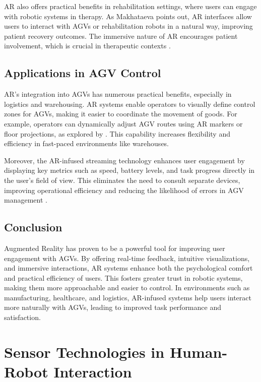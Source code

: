 AR also offers practical benefits in rehabilitation settings, where users can engage with robotic systems in therapy. As Makhataeva \cite{Makhataeva2020} points out, AR interfaces allow users to interact with AGVs or rehabilitation robots in a natural way, improving patient recovery outcomes. The immersive nature of AR encourages patient involvement, which is crucial in therapeutic contexts \cite{Makhataeva2020}.

\subsection{Applications in AGV Control}

AR’s integration into AGVs has numerous practical benefits, especially in logistics and warehousing. AR systems enable operators to visually define control zones for AGVs, making it easier to coordinate the movement of goods. For example, operators can dynamically adjust AGV routes using AR markers or floor projections, as explored by  \cite{Fu2023}. This capability increases flexibility and efficiency in fast-paced environments like warehouses.

Moreover, the AR-infused streaming technology enhances user engagement by displaying key metrics such as speed, battery levels, and task progress directly in the user's field of view. This eliminates the need to consult separate devices, improving operational efficiency and reducing the likelihood of errors in AGV management \cite{Michalos2022}.

\subsection{Conclusion}

Augmented Reality has proven to be a powerful tool for improving user engagement with AGVs. By offering real-time feedback, intuitive visualizations, and immersive interactions, AR systems enhance both the psychological comfort and practical efficiency of users. This fosters greater trust in robotic systems, making them more approachable and easier to control. In environments such as manufacturing, healthcare, and logistics, AR-infused systems help users interact more naturally with AGVs, leading to improved task performance and satisfaction.

\section{Sensor Technologies in Human-Robot Interaction}

